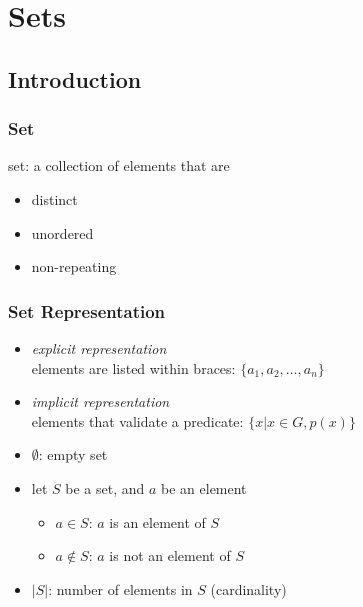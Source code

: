 \documentclass[dvipsnames]{beamer}
\begin{document}
\section{Sets}

\subsection{Introduction}

\begin{frame}
  \frametitle{Set}

  \begin{definition}
    \alert{set}: a collection of elements that are
    \begin{itemize}
      \item distinct
      \item unordered
      \item non-repeating
    \end{itemize}
  \end{definition}
\end{frame}

\begin{frame}
  \frametitle{Set Representation}

  \begin{itemize}
    \item \emph{explicit representation}\\
      elements are listed within braces: $\{a_1,a_2,\dots,a_n\}$

    \pause
    \medskip
    \item \emph{implicit representation}\\
      elements that validate a predicate: $\{x | x \in G, p(x)\}$

    \pause
    \medskip
    \item $\emptyset$: empty set

    \pause
    \medskip
    \item let $S$ be a set, and $a$ be an element
    \begin{itemize}
      \item $a \in S$: $a$ is an element of $S$
      \item $a \notin S$: $a$ is not an element of $S$
    \end{itemize}

    \pause
    \medskip
    \item $|S|$: number of elements in $S$ (\alert{cardinality})
  \end{itemize}
\end{frame}
\end{document}
